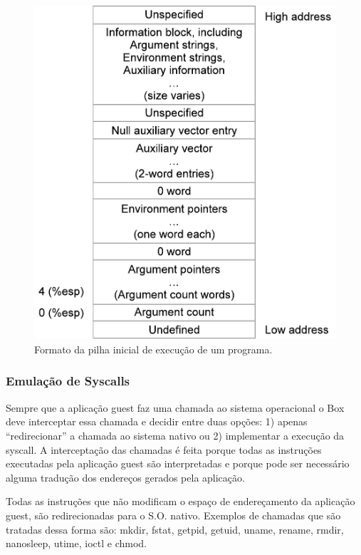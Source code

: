 \documentclass[11pt,twoside]{article}
\begin{document}
\begin{figure}[!h]
  	\begin{center}
    	\includegraphics[scale=0.5]{figures/stack_ini}
	\end{center}
	\caption{Formato da pilha inicial de execução de um programa.}
	\label{fig:stack_ini}
\end{figure}

\subsubsection{Emulação de Syscalls}

Sempre que a aplicação guest faz uma chamada ao sistema operacional o Box deve
interceptar essa chamada e decidir entre duas opções: 1) apenas ``redirecionar''
a chamada ao sistema nativo ou 2) implementar a execução da syscall. A
interceptação das chamadas é feita porque todas as instruções executadas pela
aplicação guest são interpretadas e porque pode ser necessário alguma tradução
dos endereços gerados pela aplicação.

Todas as instruções que não modificam o espaço de endereçamento da aplicação
guest, são redirecionadas para o S.O. nativo. Exemplos de chamadas que são
tratadas dessa forma são: mkdir, fstat, getpid, getuid, uname, rename, rmdir,
nanosleep, utime, ioctl e chmod.
\end{document}
